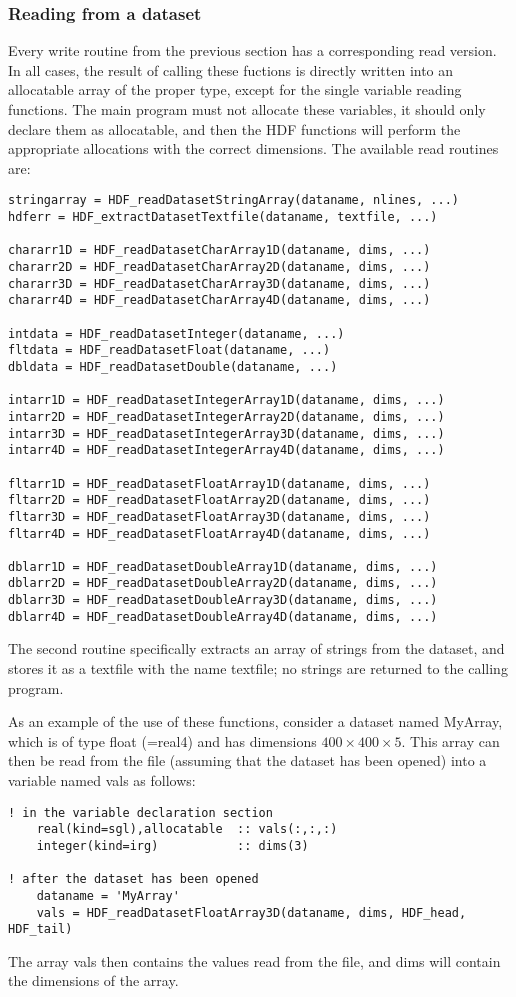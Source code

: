 \documentclass[DIV=calc, paper=letter, fontsize=11pt]{scrartcl}	 %
\begin{document}
\subsubsection{Reading from a dataset}
Every write routine from the previous section has a corresponding read version.  In 
all cases, the result of calling these fuctions is directly written into an allocatable 
array of the proper type, except for the single variable reading functions.  
The main program must not allocate these variables, it should
only declare them as allocatable, and then the HDF functions will perform the appropriate
allocations with the correct dimensions. The available read routines are:
\begin{verbatim}
stringarray = HDF_readDatasetStringArray(dataname, nlines, ...)
hdferr = HDF_extractDatasetTextfile(dataname, textfile, ...) 

chararr1D = HDF_readDatasetCharArray1D(dataname, dims, ...) 
chararr2D = HDF_readDatasetCharArray2D(dataname, dims, ...) 
chararr3D = HDF_readDatasetCharArray3D(dataname, dims, ...) 
chararr4D = HDF_readDatasetCharArray4D(dataname, dims, ...) 

intdata = HDF_readDatasetInteger(dataname, ...)
fltdata = HDF_readDatasetFloat(dataname, ...)
dbldata = HDF_readDatasetDouble(dataname, ...) 

intarr1D = HDF_readDatasetIntegerArray1D(dataname, dims, ...) 
intarr2D = HDF_readDatasetIntegerArray2D(dataname, dims, ...) 
intarr3D = HDF_readDatasetIntegerArray3D(dataname, dims, ...) 
intarr4D = HDF_readDatasetIntegerArray4D(dataname, dims, ...) 

fltarr1D = HDF_readDatasetFloatArray1D(dataname, dims, ...) 
fltarr2D = HDF_readDatasetFloatArray2D(dataname, dims, ...) 
fltarr3D = HDF_readDatasetFloatArray3D(dataname, dims, ...) 
fltarr4D = HDF_readDatasetFloatArray4D(dataname, dims, ...) 

dblarr1D = HDF_readDatasetDoubleArray1D(dataname, dims, ...)
dblarr2D = HDF_readDatasetDoubleArray2D(dataname, dims, ...)
dblarr3D = HDF_readDatasetDoubleArray3D(dataname, dims, ...)
dblarr4D = HDF_readDatasetDoubleArray4D(dataname, dims, ...)
\end{verbatim}
The second routine specifically extracts an array of strings from the dataset, and
stores it as a textfile with the name \textsf{textfile}; no strings are returned to the 
calling program.

As an example of the use of these functions, consider a dataset named \textsf{MyArray}, which 
is of type \textsf{float} (=real4) and has dimensions $400\times 400 \times 5$.  This array can
then be read from the file (assuming that the dataset has been opened) into a variable named \textsf{vals}
as follows:
\begin{verbatim}
! in the variable declaration section
	real(kind=sgl),allocatable	:: vals(:,:,:)
	integer(kind=irg)			:: dims(3)
	
! after the dataset has been opened
	dataname = 'MyArray'
	vals = HDF_readDatasetFloatArray3D(dataname, dims, HDF_head, HDF_tail)
\end{verbatim}
The array \textsf{vals} then contains the values read from the file, and \textsf{dims} will
contain the dimensions of the array.
\end{document}
